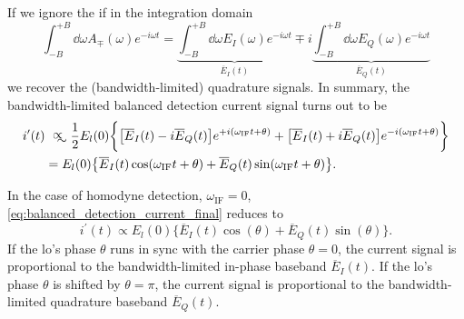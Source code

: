 If we ignore the \gls{if} in the integration domain
\begin{equation}
    \int_{-B}^{+B}\dd{\omega}A_\mp(\omega)e^{-i\omega t}
    =
    \underbrace{\int_{-B}^{+B}\dd{\omega}E_I(\omega)e^{-i\omega t}}_{\overline{E}_I(t)}
    \mp
    i\underbrace{\int_{-B}^{+B}\dd{\omega}E_Q(\omega)e^{-i\omega t}}_{\overline{E}_Q(t)}
\end{equation}
we recover the (bandwidth-limited) quadrature signals.
In summary, the bandwidth-limited balanced detection current signal turns out to be
\begin{align}
    i^\prime(t)
    &\approxprop
    \frac{1}{2}E_l(0)
    \biggl\{
        \bigl[
            \overline{E}_I(t)-i\overline{E}_Q(t)
        \bigr]
        e^{+i(\omega_\text{IF}t+\theta)}
        +
        \bigl[
            \overline{E}_I(t)+i\overline{E}_Q(t)
        \bigr]
        e^{-i(\omega_\text{IF}t+\theta)}
    \biggr\}\\
    &=
    E_l(0)
    \bigl\{
        \overline{E}_I(t)\cos(\omega_\text{IF}t+\theta)
        +
        \overline{E}_Q(t)\sin(\omega_\text{IF}t+\theta)
    \bigr\}
    \label{eq:balanced_detection_current_final}.
\end{align}

In the case of homodyne detection, $\omega_\text{IF}=0$, \cref{eq:balanced_detection_current_final} reduces to
\begin{equation}
    i^\prime(t)
    \propto
    E_l(0)
    \bigl\{
        \overline{E}_I(t)\cos(\theta)
        +
        \overline{E}_Q(t)\sin(\theta)
    \bigr\}.
\end{equation}
If the \gls{lo}'s phase $\theta$ runs in sync with the carrier phase $\theta=0$, the current signal is proportional to the bandwidth-limited in-phase baseband $\overline{E}_I(t)$.
If the \gls{lo}'s phase $\theta$ is shifted by $\theta=\pi$, the current signal is proportional to the bandwidth-limited quadrature baseband $\overline{E}_Q(t)$.